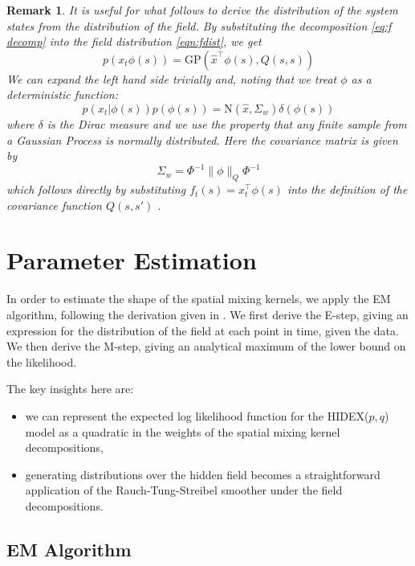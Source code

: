\documentclass{IEEEtran}
\newcommand{\dist}[2]{\|#1\|_{#2}}
\newtheorem{remark}{Remark}
\begin{document}
\begin{remark}
	It is useful for what follows to derive the distribution of the system states from the distribution of the field. By substituting the decomposition \ref{eq:f decomp} into the field distribution \ref{eqn:fdist}, we get
	\begin{equation}
		p(x_t\phi(s)) = \mathrm{GP}(\hat{x}^\top\phi(s),Q(s,s))
	\end{equation}
	We can expand the left hand side trivially and, noting that we treat $\phi$ as a deterministic function:
	 \begin{equation}
		p(x_t|\phi(s))p(\phi(s)) = \mathrm{N}(\hat{x},\Sigma_w)\delta(\phi(s))
	\end{equation}
	where $\delta$ is the Dirac measure and we use the property that any finite sample from a Gaussian Process is normally distributed. Here the covariance matrix is given by
	\begin{equation}
		\Sigma_w = \Phi^{-1}\dist{\phi}{Q} \Phi^{-1}
	\end{equation}
	which follows directly by substituting $f_t(s) = x_t^\top\phi(s)$ into the definition of the covariance function $Q(s,s')$ \cite{Scerri09}.
\end{remark}

\section{Parameter Estimation}
\label{sec:estimation}

In order to estimate the shape of the spatial mixing kernels, we apply the EM algorithm, following the derivation given in \cite{GibsonNinness}. We first derive the E-step, giving an expression for the distribution of the field at each point in time, given the data. We then derive the M-step, giving an analytical maximum of the lower bound on the likelihood.

The key insights here are:
\begin{itemize}
	\item we can represent the expected log likelihood function for the HIDEX($p,q$) model as a quadratic in the weights of the spatial mixing kernel decompositions,
	\item generating distributions over the hidden field becomes a straightforward application of the Rauch-Tung-Streibel smoother \cite{Rauch} under the field decompositions.
\end{itemize} 

\subsection{EM Algorithm}
\end{document}
